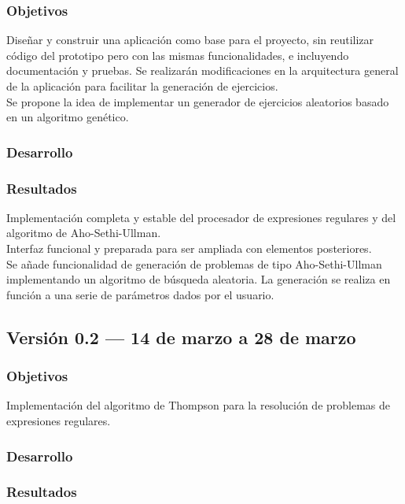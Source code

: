 \subsubsection{Objetivos}
Diseñar y construir una aplicación como base para el proyecto, sin reutilizar código del prototipo pero con las mismas funcionalidades, e incluyendo documentación y pruebas.
Se realizarán modificaciones en la arquitectura general de la aplicación para facilitar la generación de ejercicios.
\\
Se propone la idea de implementar un generador de ejercicios aleatorios basado en un algoritmo genético.

\subsubsection{Desarrollo}

\subsubsection{Resultados}
Implementación completa y estable del procesador de expresiones regulares y del algoritmo de Aho-Sethi-Ullman.
\\
Interfaz funcional y preparada para ser ampliada con elementos posteriores.
\\
Se añade funcionalidad de generación de problemas de tipo Aho-Sethi-Ullman implementando un algoritmo de búsqueda aleatoria.
La generación se realiza en función a una serie de parámetros dados por el usuario.

\subsection{Versión 0.2 --- 14 de marzo a 28 de marzo}

\subsubsection{Objetivos}
Implementación del algoritmo de Thompson para la resolución de problemas de expresiones regulares.

\subsubsection{Desarrollo}

\subsubsection{Resultados}

